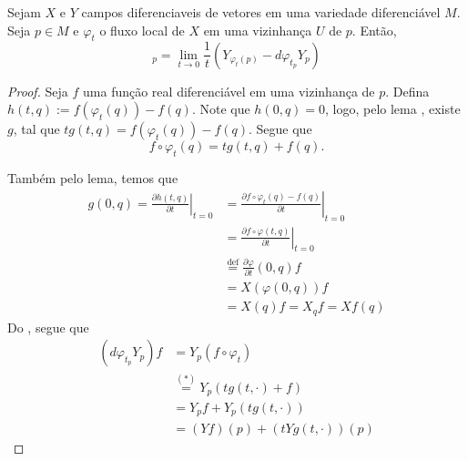 \begin{proposition}
    \label{loc:5.4_prop_:_colchetes_como_limite_do_fluxo_local}
    Sejam $X$ e $Y$ campos diferenciaveis de vetores em uma variedade diferenciável $M$. Seja $p \in M$ e $\varphi_{t}$ o fluxo local de $X$ em uma vizinhança $U$ de $p$.
    Então,
    \begin{equation*}
        [X,Y]_{p}=\lim_{ t \to 0 } \frac{1}{t}(Y_{\varphi_{t}(p)}-d\varphi_{t_{p}}Y_{p})
    \end{equation*}
    \begin{proof}

        Seja $f$ uma função real diferenciável em uma vizinhança de $p$.
        Defina $h(t,q):=f(\varphi _{t}(q))-f(q)$. Note que $h(0,q)=0$, logo, pelo lema , existe $g$, tal que $tg(t,q)=f(\varphi_{t}(q))-f(q)$.
        Segue que
        \begin{equation*}
            f \circ \varphi_{t}(q)=tg(t,q)+f(q). \tag{$*$}
        \end{equation*}

        Também pelo lema, temos que
        \begin{align*}
            g(0,q)=\left.\frac{\partial h(t,q)}{\partial t}\right|_{t=0} & =\left.\frac{\partial f \circ\varphi_{t}(q)-f(q)}{\partial t}\right|_{t=0} \\
                                                                         & = \left.\frac{\partial f \circ \varphi(t,q)}{\partial t}\right|_{t=0}      \\
                                                                         & \overset{\text{def}}{=} \frac{\partial \varphi}{\partial t}(0, q)f         \\
                                                                         & =X(\varphi(0, q))f                                                         \\
                                                                         & = X(q)f =X_{q}f=Xf(q) \tag{$**$}
        \end{align*}
        Do , segue que
        \begin{align*}
            (d\varphi_{t_{p}}Y_{p})f & = Y_{p}(f \circ  \varphi_{t})            \\
                                     & \overset{(*)}{=}Y_{p}(tg(t, \cdot)+f)    \\
                                     & =Y_{p}f + Y_{p}(tg(t, \cdot))            \\
                                     & = (Yf)(p)+(tYg(t, \cdot))(p) \tag{$***$}
        \end{align*}


\end{proof}
\end{proposition}
